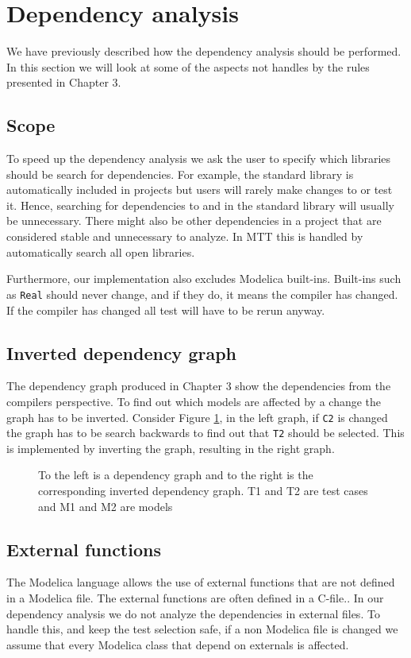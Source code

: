 \documentclass{cslthse-msc}
\begin{document}
\section{Dependency analysis}
We have previously described how the dependency analysis should be performed. In this section we will look at some of the aspects not handles by the rules presented in Chapter 3.

\subsection{Scope}
To speed up the dependency analysis we ask the user to specify which libraries should be search for dependencies. For example, the standard library is automatically included in projects but users will rarely make changes to or test it. Hence, searching for dependencies to and in the standard library will usually be unnecessary. There might also be other dependencies in a project that are considered stable and unnecessary to analyze. In MTT this is handled by automatically search all open libraries.

Furthermore, our implementation also excludes Modelica built-ins. Built-ins such as \texttt{Real} should never change, and if they do, it means the compiler has changed. If the compiler has changed all test will have to be rerun anyway.

\subsection{Inverted dependency graph}
The dependency graph produced in Chapter 3 show the dependencies from the compilers perspective. To find out which models are affected by a change the graph has to be inverted. Consider Figure \ref{fig:invertedGraph}, in the left graph, if \texttt{C2} is changed the graph has to be search backwards to find out that \texttt{T2} should be selected. This is implemented by inverting the graph, resulting in the right graph.

\begin{figure}[!htbp]
    \centering
    \qquad
    \caption{To the left is a dependency graph and to the right is the corresponding inverted dependency graph. T1 and T2 are test cases and M1 and M2 are models}
    \label{fig:invertedGraph}
\end{figure}

\subsection{External functions}
The Modelica language allows the use of external functions that are not defined in a Modelica file. The external functions are often defined in a C-file.\cite{modelicamodelica}. In our dependency analysis we do not analyze the dependencies in external files. To handle this, and keep the test selection safe, if a non Modelica file is changed we assume that every Modelica class that depend on externals is affected.
\end{document}
